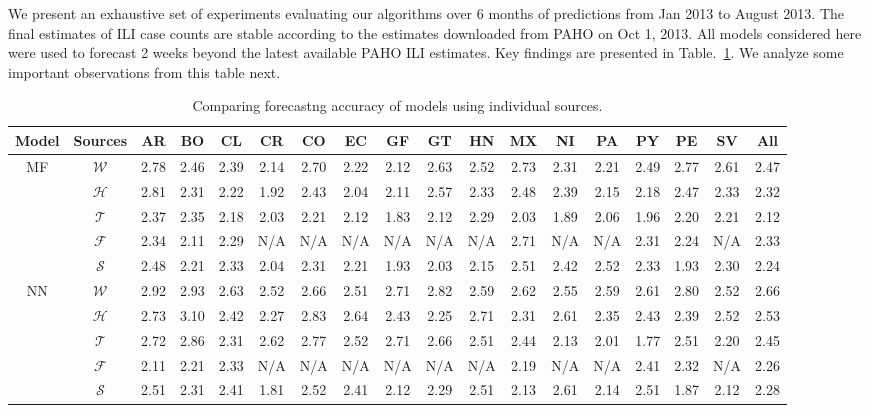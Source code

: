 
We present an exhaustive set of experiments evaluating our algorithms 
over 6 months of predictions 
from Jan 2013 to August 2013. The final estimates of ILI case counts are stable according
to the estimates downloaded from PAHO on Oct 1, 2013. All models considered here were
used to forecast 2 weeks beyond the latest available PAHO ILI estimates. 
Key findings
are presented in 
Table.~\ref{tb:comparison_single}. We analyze 
some important observations from this table next.

\begin{table}
\scriptsize
\centering
\caption{\label{tb:comparison_single}  Comparing forecastng accuracy of models using individual sources.}
\vspace{-1em}
\begin{tabular}{|*{18}{c|}}
\hline
Model               & Sources       & AR & BO & CL & CR & CO & EC & GF & GT & HN & MX & NI & PA & PY & PE & SV & All\\
\hline \hline
\multirow{5}{*}{MF} & $\mathcal{W}$ &2.78&2.46&2.39&2.14&2.70&2.22&2.12&2.63&2.52&2.73&2.31&2.21&2.49&2.77&2.61&2.47\\ 
                    & $\mathcal{H}$ &2.81&2.31&2.22&1.92&2.43&2.04&2.11&2.57&2.33&2.48&2.39&2.15&2.18&2.47&2.33&2.32\\ 
                    & $\mathcal{T}$ &2.37&2.35&2.18&2.03&2.21&2.12&1.83&2.12&2.29&2.03&1.89&2.06&1.96&2.20&2.21&2.12\\ 
                    & $\mathcal{F}$ &2.34&2.11&2.29& N/A& N/A& N/A& N/A& N/A& N/A&2.71& N/A& N/A&2.31&2.24& N/A&2.33\\ 
                    & $\mathcal{S}$ &2.48&2.21&2.33&2.04&2.31&2.21&1.93&2.03&2.15&2.51&2.42&2.52&2.33&1.93&2.30&2.24 \\ 
\hline
\multirow{5}{*}{NN} & $\mathcal{W}$ &2.92&2.93&2.63&2.52&2.66&2.51&2.71&2.82&2.59&2.62&2.55&2.59&2.61&2.80&2.52&2.66\\ 
                    & $\mathcal{H}$ &2.73&3.10&2.42&2.27&2.83&2.64&2.43&2.25&2.71&2.31&2.61&2.35&2.43&2.39&2.52&2.53\\ 
                    & $\mathcal{T}$ &2.72&2.86&2.31&2.62&2.77&2.52&2.71&2.66&2.51&2.44&2.13&2.01&1.77&2.51&2.20&2.45\\ 
                    & $\mathcal{F}$ &2.11&2.21&2.33& N/A& N/A& N/A& N/A& N/A& N/A&2.19& N/A& N/A&2.41&2.32& N/A&2.26\\ 
                    & $\mathcal{S}$ &2.51&2.31&2.41&1.81&2.52&2.41&2.12&2.29&2.51&2.13&2.61&2.14&2.51&1.87&2.12&2.28 \\ 

\end{tabular}
\end{table}
